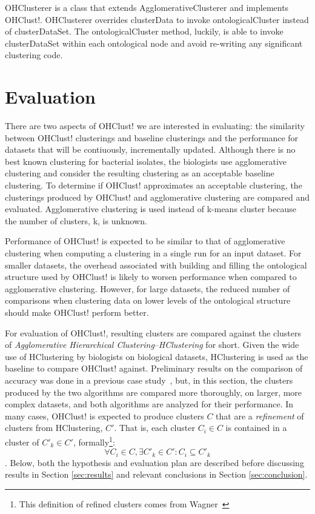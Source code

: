 \documentclass[12pt]{ucthesis}
\begin{document}
      OHClusterer is a class that extends AgglomerativeClusterer and
      implements \textsf{OHClust!}. OHClusterer overrides
      \textsf{clusterData} to invoke \textsf{ontologicalCluster} instead of
      \textsf{clusterDataSet}. The \textsf{ontologicalCluster} method, luckily,
      is able to invoke \textsf{clusterDataSet} within each ontological node
      and avoid re-writing any significant clustering code.

\chapter{Evaluation}\label{chap:evaluation}
   There are two aspects of \textsf{OHClust!} we are interested in evaluating:
   the similarity between \textsf{OHClust!} clusterings and baseline
   clusterings and the performance for datasets that will be contiuously,
   incrementally updated. Although there is no best known clustering for
   bacterial isolates, the biologists use \textsf{agglomerative clustering} and
   consider the resulting clustering as an acceptable baseline clustering. To
   determine if \textsf{OHClust!} approximates an acceptable clustering, the
   clusterings produced by \textsf{OHClust!} and \textsf{agglomerative
   clustering} are compared and evaluated. \textsf{Agglomerative clustering} is
   used instead of \textsf{k-means cluster} because the number of clusters, k,
   is unknown.

   Performance of \textsf{OHClust!} is expected to be similar to that of
   \textsf{agglomerative clustering} when computing a clustering in a single
   run for an input dataset. For smaller datasets, the overhead associated with
   building and filling the ontological structure used by \textsf{OHClust!} is
   likely to worsen performance when compared to \textsf{agglomerative
   clustering}. However, for large datasets, the reduced number of comparisons
   when clustering data on lower levels of the ontological structure should
   make \textsf{OHClust!} perform better.

   For evaluation of \textsf{OHClust!}, resulting clusters are compared against the
   clusters of \textit{Agglomerative Hierarchical
   Clustering}--\textit{HClustering} for short. Given the wide use of
   HClustering by biologists on biological datasets, HClustering is used as
   the baseline to compare \textsf{OHClust!} against. Preliminary results on the
   comparison of accuracy was done in a previous case
   study~\cite{Montana:ChronoCluster}, but, in this section, the
   clusters produced by the two algorithms are compared more thoroughly, on larger, more
   complex datasets, and both algorithms are analyzed for their performance. In many
   cases, \textsf{OHClust!} is expected to produce clusters $C$ that are a
   \textit{refinement} of clusters from HClustering, $C'$. That is, each
   cluster $C_i \in C$ is contained in a cluster of $C'_k \in C'$,
   formally\footnote{This definition of refined clusters comes from
   Wagner~\cite{Wagner:Overview}}:
   $$\forall C_i \in C, \exists C'_k \in C' : C_i \subseteq C'_k$$.
   Below, both the hypothesis and evaluation plan are described before discussing
   results in Section \ref{sec:results} and relevant conclusions in Section
   \ref{sec:conclusion}.
\end{document}
